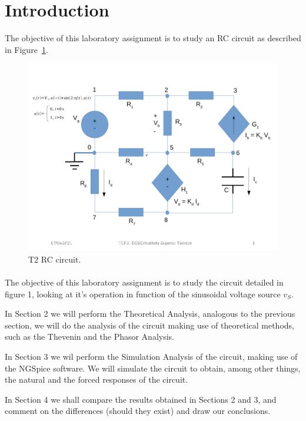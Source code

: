 \section{Introduction}
\label{sec:introduction}


\par The objective of this laboratory assignment is to study an RC circuit as described in Figure~\ref{fig:rc}.


\begin{figure}[h]
\centering
\includegraphics[width=0.9\linewidth]{../doc/rc.pdf}
\caption{T2 RC circuit.}
\label{fig:rc}
\end{figure}


\paragraph{} The objective of this laboratory assignment is to study the circuit detailed in figure 1, looking at it's operation in function of the sinusoidal voltage source $v_S$.


In Section 2 we will perform the Theoretical Analysis, analogous to the previous section, we will do the analysis of the circuit making use of theoretical methods, such as the Thevenin and the Phasor Analysis.

In Section 3 we wil perform the Simulation Analysis of the circuit, making use of the NGSpice software. We will simulate the circuit to obtain, among other things, the natural and the forced responses of the circuit.



In Section 4 we shall compare the results obtained in Sections 2 and 3, and comment on the differences (should they exist) and draw our conclusions. 

